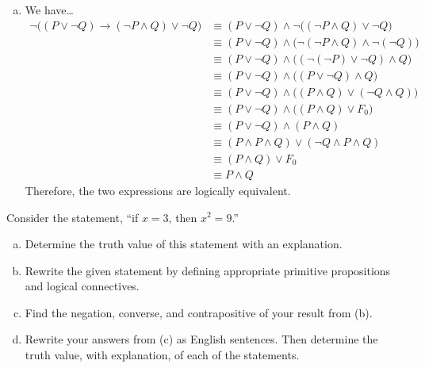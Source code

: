 \documentclass[11pt,letterpaper]{article}
\begin{document}
\begin{enumerate}[(a)]
\item We have\dots
	\[
	\begin{aligned}
	\neg \big( (P \vee \neg Q) \to (\neg P \wedge Q) \vee \neg Q \big) &\equiv (P \vee \neg Q) \wedge \neg \big( (\neg P \wedge Q) \vee \neg Q \big) \\
	&\equiv (P \vee \neg Q) \wedge \big( \neg( \neg P \wedge Q) \wedge \neg(\neg Q) \big) \\
	&\equiv (P \vee \neg Q) \wedge \big( ( \neg(\neg P) \vee \neg Q) \wedge Q \big) \\
	&\equiv (P \vee \neg Q) \wedge \big( (P \vee \neg Q) \wedge Q \big) \\
	&\equiv (P \vee \neg Q) \wedge \big( (P \wedge Q) \vee (\neg Q \wedge Q) \big) \\
	&\equiv (P \vee \neg Q) \wedge \big( (P \wedge Q) \vee F_0 \big) \\
	&\equiv (P \vee \neg Q) \wedge (P \wedge Q) \\ 
	&\equiv (P \wedge P \wedge Q) \vee (\neg Q \wedge P \wedge Q) \\
	&\equiv (P \wedge Q) \vee F_0 \\
	&\equiv P \wedge Q
	\end{aligned}
	\]
Therefore, the two expressions are logically equivalent. 
\end{enumerate}



\newpage



 Consider the statement, ``if $x= 3$, then $x^2= 9$.''
	\begin{enumerate}[(a)]
	\item Determine the truth value of this statement with an explanation. 
	\item Rewrite the given statement by defining appropriate primitive propositions and logical connectives. 
	\item Find the negation, converse, and contrapositive of your result from (b).
	\item Rewrite your answers from (c) as English sentences. Then determine the truth value, with explanation, of each of the statements. 
	\end{enumerate} \pspace
\end{document}

